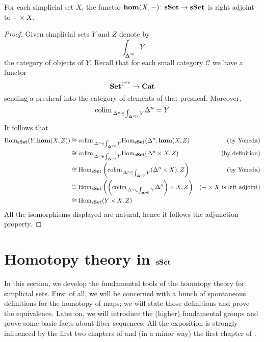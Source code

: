 \begin{refsection}
\begin{prop} \label{prop sset cartesian closed}
For each simplicial set $X$, the functor $\mathbf{hom}(X,-) \colon \mathbf{sSet} \to \mathbf{sSet}$ is right adjoint to $- \times X$.
\end{prop}

\begin{proof}
Given simplicial sets $Y$ and $Z$ denote by
\[
\int_{\mathbf \Delta^{\mathrm{op}}} Y
\]
the category of objects of $Y$. Recall that for each small category $\mathcal C$ we have a functor
\[
\mathbf{Set}^{\mathcal C^{\mathrm{op}}} \to \mathbf{Cat}
\]
sending a presheaf into the category of elements of that presheaf. Moreover,
\[
\mathrm{colim} \,_{\Delta^n \in \int_{\mathbf \Delta^{\mathrm{op}}} Y} \Delta^n = Y
\]
It follows that
\begin{align*}
\mathrm{Hom}_{\mathbf{sSet}}(Y, \mathbf{hom}(X,Z)) & \cong \mathrm{colim} \,_{\Delta^n \in \int_{\mathbf \Delta^{\mathrm{op}}} Y} \mathrm{Hom}_{\mathbf{sSet}}(\Delta^n, \mathbf{hom}(X,Z) & \text{(by Yoneda)} \\
& \cong \mathrm{colim} \,_{\Delta^n \in \int_{\mathbf \Delta^{\mathrm{op}}} Y} \mathrm{Hom}_{\mathbf{sSet}} (\Delta^n \times X, Z) & \text{(by definition)} \\
& \cong \mathrm{Hom}_{\mathbf{sSet}} \left( \mathrm{colim} \,_{\Delta^n \in \int_{\mathbf \Delta^{\mathrm{op}}} Y} (\Delta^n \times X), Z \right) & \text{(by Yoneda)} \\
& \cong \mathrm{Hom}_{\mathbf{sSet}} \left( \left( \mathrm{colim} \,_{\Delta^n \in \int_{\mathbf \Delta^{\mathrm{op}}} Y} \Delta^n \right) \times X, Z \right) & \text{($- \times X$ is left adjoint)} \\
& \cong \mathrm{Hom}_{\mathbf{sSet}} (Y \times X, Z)
\end{align*}
All the isomorphisms displayed are natural, hence it follows the adjunction property.
\end{proof}


\section{Homotopy theory in $\mathbf{sSet}$}

In this section, we develop the fundamental tools of the homotopy theory for simplicial sets. First of all, we will be concerned with a bunch of spontaneous definitions for the homotopy of maps; we will state those definitions and prove the equivalence. Later on, we will introduce the (higher) fundamental groups and prove some basic facts about fiber sequences. All the exposition is strongly influenced by the first two chapters of \cite{may} and (in a minor way) the first chapter of \cite{gj}.


\end{refsection}
